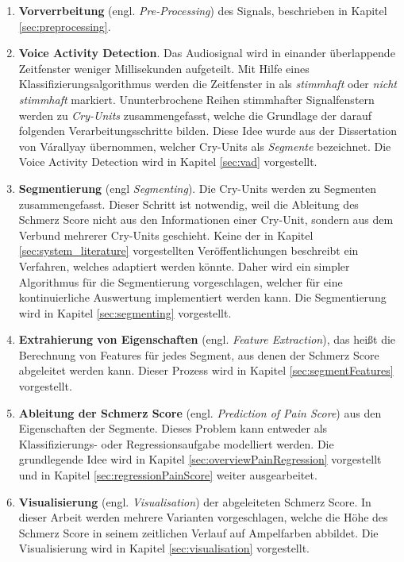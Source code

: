 \begin{enumerate}[leftmargin=*]
	\item \textbf{Vorverrbeitung} (engl. \emph{Pre-Processing}) des Signals, beschrieben in Kapitel \ref{sec:preprocessing}.
	
	\item \textbf{Voice Activity Detection}. Das Audiosignal wird in einander überlappende Zeitfenster weniger Millisekunden  aufgeteilt. Mit Hilfe eines Klassifizierungsalgorithmus werden die Zeitfenster in als \emph{stimmhaft} oder \emph{nicht stimmhaft} markiert. Ununterbrochene Reihen stimmhafter Signalfenstern werden zu \emph{Cry-Units} zusammengefasst, welche die Grundlage der darauf folgenden Verarbeitungsschritte bilden. Diese Idee wurde aus der Dissertation von Várallyay \cite[S. 16 - 17]{cry_thesis} übernommen, welcher Cry-Units als \emph{Segmente} bezeichnet. Die Voice Activity Detection wird in Kapitel \ref{sec:vad} vorgestellt.
	
	\item \textbf{Segmentierung} (engl \emph{Segmenting}). Die Cry-Units werden zu Segmenten zusammengefasst. Dieser Schritt ist notwendig, weil die Ableitung des Schmerz Score nicht aus den Informationen einer Cry-Unit, sondern aus dem Verbund mehrerer Cry-Units geschieht. Keine der in Kapitel \ref{sec:system_literature} vorgestellten Veröffentlichungen beschreibt ein Verfahren, welches adaptiert werden könnte. Daher wird ein simpler Algorithmus für die Segmentierung vorgeschlagen, welcher für eine kontinuierliche Auswertung implementiert werden kann. Die Segmentierung wird in Kapitel \ref{sec:segmenting} vorgestellt.		
	
	\item \textbf{Extrahierung von Eigenschaften} (engl. \emph{Feature Extraction}), das heißt die Berechnung von Features für jedes Segment, aus denen der Schmerz Score abgeleitet werden kann. Dieser Prozess wird in Kapitel \ref{sec:segmentFeatures} vorgestellt.	
	
	\item \textbf{Ableitung der Schmerz Score} (engl. \emph{Prediction of Pain Score}) aus den Eigenschaften der Segmente. Dieses Problem kann entweder als Klassifizierungs- oder Regressionsaufgabe modelliert werden. Die grundlegende Idee wird in Kapitel \ref{sec:overviewPainRegression} vorgestellt und in Kapitel \ref{sec:regressionPainScore} weiter ausgearbeitet.
	
	\item \textbf{Visualisierung} (engl. \emph{Visualisation}) der abgeleiteten Schmerz Score. In dieser Arbeit werden mehrere Varianten vorgeschlagen, welche die Höhe des Schmerz Score in seinem zeitlichen Verlauf auf Ampelfarben abbildet. Die Visualisierung wird in Kapitel \ref{sec:visualisation}	vorgestellt.
\end{enumerate}

